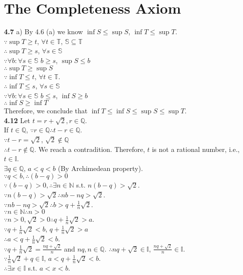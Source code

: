 \documentclass{article}
\begin{document}
\section{The Completeness Axiom}
\textbf{4.7} a) By 4.6 (a) we know
$ \inf S \leq \sup S$, $\inf T \leq \sup T$.
\\$ \because \sup T \geq t$, $\forall t \in \mathbb{T}$, $\mathbb{S} \subseteq \mathbb{T}$
\\$ \therefore \sup T \geq s$, $\forall s \in \mathbb{S}$
\\$ \because \forall b: \forall s \in \mathbb{S}$ $ b \geq s$, $\sup S \leq b$
\\$ \therefore \sup T \geq \sup S$
\\$ \because \inf T \leq t$, $\forall t \in \mathbb{T}$.
\\$ \therefore \inf T \leq s$, $\forall s \in \mathbb{S}$
\\$ \because \forall b: \forall s \in \mathbb{S}$ $b \leq s$, $\inf S \geq b$
\\$ \therefore \inf S \geq \inf T$
\\ Therefore, we conclude that $\inf T \leq \inf S \leq \sup S \leq \sup T$.
\\ \textbf{4.12} Let $t = r + \sqrt{2}, r \in \mathbb{Q}$. 
\\ If $t \in \mathbb{Q}$, $\because r \in \mathbb{Q} \therefore t-r \in \mathbb{Q}$.
\\ $\because t - r = \sqrt{2}$, $\sqrt{2} \notin \mathbb{Q}$
\\ $\therefore t-r \notin \mathbb{Q}$. We reach a contradition. Therefore, $t$ is not a rational number, i.e., $t \in \mathbb{I}$.
\\ $\exists q \in \mathbb{Q}$, $a < q < b$ (By Archimedean property).
\\ $\because q < b, \therefore (b-q) > 0$
\\ $\because (b-q) > 0, \therefore \exists n \in \mathbb{N}$ s.t. $n(b-q) > \sqrt{2}$.
\\ $\because n(b-q) > \sqrt{2} \therefore nb - nq > \sqrt{2}$.
\\ $\because nb - nq > \sqrt{2} \therefore b > q + \frac{1}{n}\sqrt{2}$.
\\ $\because n \in \mathbb{N} \therefore n > 0$
\\ $\because n > 0, \sqrt{2} > 0 \therefore q + \frac{1}{n}\sqrt{2} > a$.
\\ $\because q + \frac{1}{n} \sqrt{2} < b$, $q + \frac{1}{n}\sqrt{2} > a$
\\ $\therefore a < q + \frac{1}{n}\sqrt{2} < b$.
\\ $\because q + \frac{1}{n}\sqrt{2} = \frac{nq + \sqrt{2}}{n}$ and $nq,n \in \mathbb{Q}$. $\therefore nq + \sqrt{2} \in \mathbb{I}$, $\frac{nq + \sqrt{2}}{n} \in \mathbb{I}$.
\\ $\because \frac{1}{n}\sqrt{2} + q \in \mathbb{I}$, $a < q + \frac{1}{n}\sqrt{2} < b$.
\\ $\therefore \exists x \in \mathbb{I}$ s.t. $a < x < b$.
\end{document}

